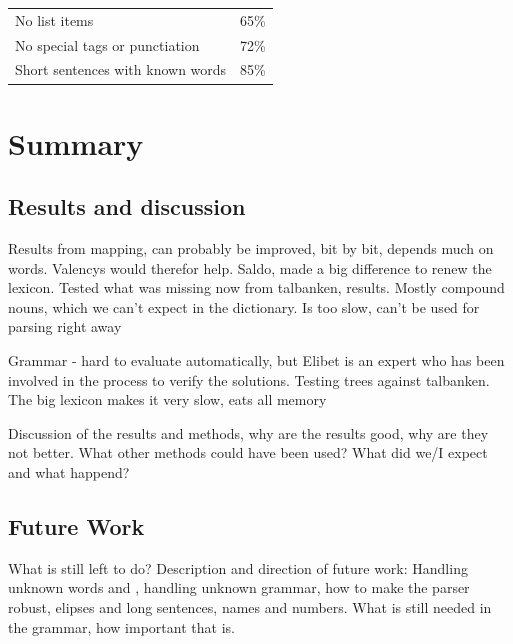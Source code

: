 \documentclass{report}
\begin{document}
\begin{tabular}{ll}
No list items & 65\%\\
No special tags or punctiation & 72\%\\
Short sentences with known words & 85\%\\
\end{tabular}




\chapter{Summary}
\section{Results and discussion}
Results from mapping, can probably be improved, bit by bit, depends much on words.
Valencys would therefor help.  
Saldo, made a big difference to renew the lexicon. Tested what was missing now from talbanken,
results. Mostly compound nouns, which we can't expect in the dictionary.
Is too slow, can't be used for parsing right away

Grammar - hard to evaluate automatically, but Elibet is an expert who has been involved
in the process to verify the solutions. Testing trees against talbanken.
The big lexicon makes it very slow, eats all memory

Discussion of the results and methods, why are the results good, why are they not better.
What other methods could have been used? What did we/I expect and what happend?


\section{Future Work}
\label{sec:future}
What is still left to do? Description and direction of future work:
Handling unknown words and , handling unknown grammar, 
how to make the parser robust, elipses and long sentences, names and numbers.
What is still needed in the grammar, how important that is. 
\end{document}
